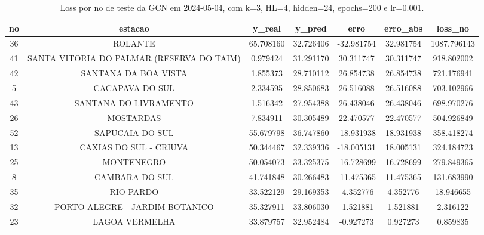 \begin{table}[h]
\centering
\caption{Loss por no de teste da GCN em 2024-05-04, com k=3, HL=4, hidden=24, epochs=200 e lr=0.001.}
\label{tab:gcn_loss_k3_hl4_h24_e200_d20240504}
\begin{tabular}{ccccccc}
\toprule
no & estacao & y\_real & y\_pred & erro & erro\_abs & loss\_no \\
\midrule
36 & ROLANTE & 65.708160 & 32.726406 & -32.981754 & 32.981754 & 1087.796143 \\
41 & SANTA VITORIA DO PALMAR (RESERVA DO TAIM) & 0.979424 & 31.291170 & 30.311747 & 30.311747 & 918.802002 \\
42 & SANTANA DA BOA VISTA & 1.855373 & 28.710112 & 26.854738 & 26.854738 & 721.176941 \\
5 & CACAPAVA DO SUL & 2.334595 & 28.850683 & 26.516088 & 26.516088 & 703.102966 \\
43 & SANTANA DO LIVRAMENTO & 1.516342 & 27.954388 & 26.438046 & 26.438046 & 698.970276 \\
26 & MOSTARDAS & 7.834911 & 30.305489 & 22.470577 & 22.470577 & 504.926849 \\
52 & SAPUCAIA DO SUL & 55.679798 & 36.747860 & -18.931938 & 18.931938 & 358.418274 \\
13 & CAXIAS DO SUL - CRIUVA & 50.344467 & 32.339336 & -18.005131 & 18.005131 & 324.184723 \\
25 & MONTENEGRO & 50.054073 & 33.325375 & -16.728699 & 16.728699 & 279.849365 \\
8 & CAMBARA DO SUL & 41.741848 & 30.266483 & -11.475365 & 11.475365 & 131.683990 \\
35 & RIO PARDO & 33.522129 & 29.169353 & -4.352776 & 4.352776 & 18.946655 \\
32 & PORTO ALEGRE - JARDIM BOTANICO & 35.327911 & 33.806030 & -1.521881 & 1.521881 & 2.316122 \\
23 & LAGOA VERMELHA & 33.879757 & 32.952484 & -0.927273 & 0.927273 & 0.859835 \\
\bottomrule
\end{tabular}
\end{table}
